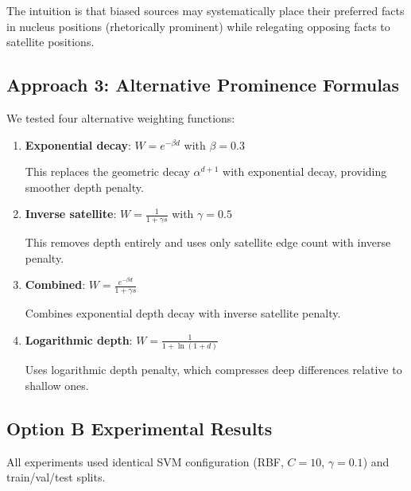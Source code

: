 \documentclass[12pt,a4paper]{article}
\begin{document}
The intuition is that biased sources may systematically place their preferred facts in nucleus
positions (rhetorically prominent) while relegating opposing facts to satellite positions.

\subsection{Approach 3: Alternative Prominence Formulas}

We tested four alternative weighting functions:

\begin{enumerate}
\item \textbf{Exponential decay}: $W = e^{-\beta d}$ with $\beta=0.3$

This replaces the geometric decay $\alpha^{d+1}$ with exponential decay,
providing smoother depth penalty.

\item \textbf{Inverse satellite}: $W = \frac{1}{1 + \gamma s}$ with $\gamma=0.5$

This removes depth entirely and uses only satellite edge count with inverse penalty.

\item \textbf{Combined}: $W = \frac{e^{-\beta d}}{1 + \gamma s}$

Combines exponential depth decay with inverse satellite penalty.

\item \textbf{Logarithmic depth}: $W = \frac{1}{1 + \ln(1+d)}$

Uses logarithmic depth penalty, which compresses deep differences relative to shallow ones.
\end{enumerate}

\subsection{Option B Experimental Results}

All experiments used identical SVM configuration (RBF, $C=10$, $\gamma=0.1$) and train/val/test splits.
\end{document}
